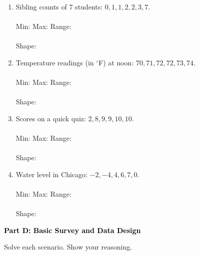 \documentclass[12pt, letterpaper, fleqn]{article}
\newcommand{\blanklong}{\underline{\hspace{6.5cm}}}
\newcommand{\blankshorter}{\underline{\hspace{1.5cm}}}
\begin{document}
\begin{enumerate}[itemsep=2cm, leftmargin=0.6cm]
\item Sibling counts of 7 students: $0, 1, 1, 2, 2, 3, 7$. \\ \\
Min: \blankshorter \quad Max: \blankshorter \quad Range: \blankshorter \\ \\
Shape: \blanklong

\item Temperature readings (in $^\circ$F) at noon: $70, 71, 72, 72, 73, 74$.\\ \\
Min: \blankshorter \quad Max: \blankshorter \quad Range: \blankshorter \\ \\
Shape: \blanklong

\item Scores on a quick quiz: $2, 8, 9, 9, 10, 10$. \\ \\
Min: \blankshorter \quad Max: \blankshorter \quad Range: \blankshorter \\ \\
Shape: \blanklong

\item Water level in Chicago: $-2, -4, 4, 6, 7, 0$. \\ \\
Min: \blankshorter \quad Max: \blankshorter \quad Range: \blankshorter \\ \\
Shape: \blanklong
\end{enumerate}

\newpage

\begin{tcolorbox}[colback=black!10]
    \large\textcolor{black}{\textbf{Part D: Basic Survey and Data Design}}
\end{tcolorbox}

\vspace{3mm}

\noindent
Solve each scenario. Show your reasoning.

\vspace{5mm}
\end{document}
